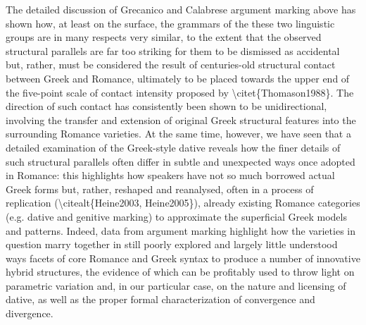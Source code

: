 \documentclass[output=paper,modfonts,nonflat]{langsci/langscibook}
\begin{document}
\begin{styleStandard}
The detailed discussion of Grecanico and Calabrese argument marking above has shown how, at least on the surface, the grammars of the these two linguistic groups are in many respects very similar, to the extent that the observed structural parallels are far too striking for them to be dismissed as accidental but, rather, must be considered the result of centuries-old structural contact between Greek and Romance, ultimately to be placed towards the upper end of the five-point scale of contact intensity proposed by {\textbackslash}citet\{Thomason1988\}. The direction of such contact has consistently been shown to be unidirectional, involving the transfer and extension of original Greek structural features into the surrounding Romance varieties. At the same time, however, we have seen that a detailed examination of the Greek-style dative reveals how the finer details of such structural parallels often differ in subtle and unexpected ways once adopted in Romance: this highlights how speakers have not so much borrowed actual Greek forms but, rather, reshaped and reanalysed, often in a process of replication ({\textbackslash}citealt\{Heine2003, Heine2005\}), already existing Romance categories (e.g. dative and genitive marking) to approximate the superficial Greek models and patterns. Indeed, data from argument marking highlight how the varieties in question marry together in still poorly explored and largely little understood ways facets of core Romance and Greek syntax to produce a number of innovative hybrid structures, the evidence of which can be profitably used to throw light on parametric variation and, in our particular case, on the nature and licensing of dative, as well as the proper formal characterization of convergence and divergence. 
\end{styleStandard}
\end{document}
